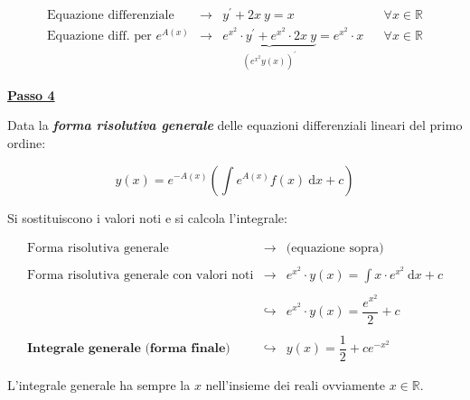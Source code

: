 \documentclass[a4paper]{article}
\begin{document}
	\begin{equation*}
		\begin{array}{lllll}
			\text{Equazione differenziale}					& \longrightarrow & y^{'} + 2x \: y = x && \forall x \in \mathbb{R}\\
			\text{Equazione diff. per } e^{A\left(x\right)}	& \longrightarrow & \underbrace{e^{x^{2}} \cdot y^{'} + e^{x^{2}} \cdot 2x \: y}_{\left(e^{x^{2}} y\left(x\right)\right)^{'}} = e^{x^{2}} \cdot x && \forall x \in \mathbb{R}
		\end{array}
	\end{equation*}

	\newpage
	
	\noindent
	\textcolor{Red3}{\textbf{\underline{Passo 4}}}\newline
	
	\noindent
	Data la \textbf{\emph{forma risolutiva generale}} delle equazioni differenziali lineari del primo ordine:
	
	\begin{equation*}\label{eq}
		y\left(x\right) = e^{-A\left(x\right)} \left(\int e^{A\left(x\right)} f\left(x\right) \: \mathrm{d}x + c\right)
	\end{equation*}
	
	\noindent
	Si sostituiscono i valori noti e si calcola l'integrale:
	
	\begin{equation*}
		\begin{array}{lll}
			\text{Forma risolutiva generale}					& \longrightarrow & \text{(equazione sopra)} \\
			&& \\
			\text{Forma risolutiva generale con valori noti}	& \longrightarrow & e^{x^{2}} \cdot y\left(x\right) = \displaystyle \int x \cdot e^{x^{2}} \: \mathrm{d}x + c \\
			&& \\
																& \hookrightarrow & e^{x^{2}} \cdot y\left(x\right) = \dfrac{e^{x^{2}}}{2} + c \\
			&& \\
			\textbf{Integrale generale (forma finale)}			& \hookrightarrow & y\left(x\right) = \dfrac{1}{2} + c e^{-x^{2}}
		\end{array}
	\end{equation*}

	\noindent
	L'integrale generale ha sempre la $x$ nell'insieme dei reali ovviamente $x \in \mathbb{R}$.
	
	\newpage
	
\end{document}

